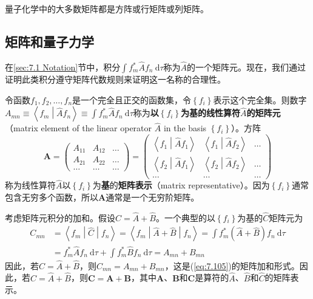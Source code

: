    量子化学中的大多数矩阵都是方阵或行矩阵或列矩阵。

\subsection*{矩阵和量子力学}

    在\ref{sec:7.1 Notation}节中，积分$\int f_m^{\ast}\hat{A}f_n \: \mathrm{d}\tau$称为$\hat{A}$的一个矩阵元。现在，我们通过证明此类积分遵守矩阵代数规则来证明这一名称的合理性。

    令函数$f_1, f_2, \ldots, f_n$是一个完全且正交的函数集，令$\left\{f_i\right\}$表示这个完全集。则数字$A_{mn} \equiv \left\langle f_m \middle| \hat{A} f_n \right\rangle \equiv \int f_m^{\ast}\hat{A}f_n \: \mathrm{d}\tau$称为\textbf{以$\left\{f_i\right\}$为基的线性算符$\hat{A}$的矩阵元}（matrix element of the linear operator $\hat{A}$ in the basis $\left\{f_i\right\}$）。方阵
    \begin{equation}
        \mathbf{A} = \begin{pmatrix}
            A_{11} & A_{12} & \ldots \\
            A_{21} & A_{22} & \ldots \\
            \ldots & \ldots & \ldots 
        \end{pmatrix}
        = \begin{pmatrix}
            \left\langle f_1 \middle| \hat{A} f_1 \right\rangle & \left\langle f_1 \middle| \hat{A} f_2 \right\rangle & \ldots \\
            \left\langle f_2 \middle| \hat{A} f_1 \right\rangle & \left\langle f_2 \middle| \hat{A} f_2 \right\rangle & \ldots \\
            \ldots & \ldots & \ldots
        \end{pmatrix}
        \label{eq:7.108}
    \end{equation}
    称为线性算符$\hat{A}$以$\left\{f_i\right\}$为\textbf{基}的\textbf{矩阵表示}（matrix representative）。因为$\left\{f_i\right\}$通常包含无穷多个函数，所以$\mathbf{A}$通常是一个无穷阶矩阵。

    考虑矩阵元积分的加和。假设$\hat{C} = \hat{A} + \hat{B}$。一个典型的以$\left\{f_i\right\}$为基的$\hat{C}$矩阵元为
    \begin{equation*}
        \begin{aligned}
            C_{mn} &= \left\langle f_m \middle| \hat{C} \middle| f_n \right\rangle = \left\langle f_m \middle| \hat{A} + \hat{B} \middle| f_n \right\rangle = \int f_m^{\ast}\left(\hat{A} + \hat{B}\right)f_n \: \mathrm{d}\tau \\
            &= f_m^{\ast}\hat{A}f_n\:\mathrm{d}\tau + \int f_m^{\ast}\hat{B}f_n \: \mathrm{d}\tau = A_{mn} + B_{mn}
        \end{aligned}
    \end{equation*}
    因此，若$\hat{C} = \hat{A} + \hat{B}$，则$C_{mn} = A_{mn} + B_{mn}$，这是(\ref{eq:7.105})的矩阵加和形式。因此，若$\hat{C} = \hat{A} + \hat{B}$，则$\mathbf{C} = \mathbf{A} + \mathbf{B}$，其中$\mathbf{A}$、$\mathbf{B}$和$\mathbf{C}$是算符的$\hat{A}$、$\hat{B}$和$\hat{C}$的矩阵表示。


